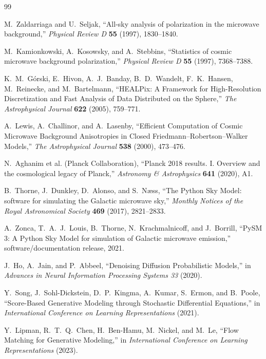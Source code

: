 \documentclass[11pt]{article}
\theoremstyle{definition}
\begin{document}
\begin{thebibliography}{99}

M.~Zaldarriaga and U.~Seljak,
``All-sky analysis of polarization in the microwave background,''
\emph{Physical Review D} \textbf{55} (1997), 1830--1840.

M.~Kamionkowski, A.~Kosowsky, and A.~Stebbins,
``Statistics of cosmic microwave background polarization,''
\emph{Physical Review D} \textbf{55} (1997), 7368--7388.

K.~M.~G\'orski, E.~Hivon, A.~J.~Banday, B.~D.~Wandelt, F.~K.~Hansen,
M.~Reinecke, and M.~Bartelmann,
``HEALPix: A Framework for High-Resolution Discretization and Fast Analysis of Data Distributed on the Sphere,''
\emph{The Astrophysical Journal} \textbf{622} (2005), 759--771.

A.~Lewis, A.~Challinor, and A.~Lasenby,
``Efficient Computation of Cosmic Microwave Background Anisotropies in Closed Friedmann--Robertson--Walker Models,''
\emph{The Astrophysical Journal} \textbf{538} (2000), 473--476.

N.~Aghanim et al. (Planck Collaboration),
``Planck 2018 results. I. Overview and the cosmological legacy of Planck,''
\emph{Astronomy \& Astrophysics} \textbf{641} (2020), A1.

B.~Thorne, J.~Dunkley, D.~Alonso, and S.~N{\ae}ss,
``The Python Sky Model: software for simulating the Galactic microwave sky,''
\emph{Monthly Notices of the Royal Astronomical Society} \textbf{469} (2017), 2821--2833.

A.~Zonca, T.~A.~J.~Louis, B.~Thorne, N.~Krachmalnicoff, and J.~Borrill,
``PySM 3: A Python Sky Model for simulation of Galactic microwave emission,''
software/documentation release, 2021.

J.~Ho, A.~Jain, and P.~Abbeel,
``Denoising Diffusion Probabilistic Models,''
in \emph{Advances in Neural Information Processing Systems 33} (2020).

Y.~Song, J.~Sohl-Dickstein, D.~P.~Kingma, A.~Kumar, S.~Ermon, and B.~Poole,
``Score-Based Generative Modeling through Stochastic Differential Equations,''
in \emph{International Conference on Learning Representations} (2021).

Y.~Lipman, R.~T.~Q.~Chen, H.~Ben-Hamu, M.~Nickel, and M.~Le,
``Flow Matching for Generative Modeling,''
in \emph{International Conference on Learning Representations} (2023).


\end{thebibliography}
\end{document}

